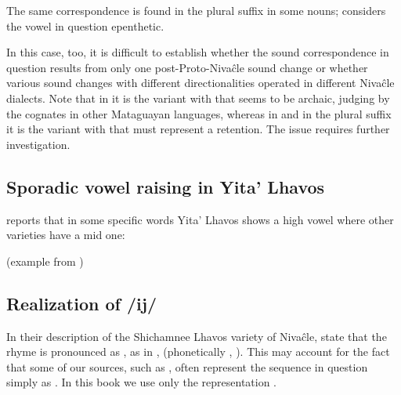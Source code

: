 The same correspondence is found in the plural suffix  in some nouns; \citet[276--277]{AnG15} considers the vowel in question epenthetic.

\ea
    \begin{xlist}
        \ex {} \recind {}
        \ex {} \recind {}
    \end{xlist}
\z
{}

In this case, too, it is difficult to establish whether the sound correspondence in question results from only one post-Proto-Nivaĉle sound change or whether various sound changes with different directionalities operated in different Nivaĉle dialects. Note that in  it is the variant with  that seems to be archaic, judging by the cognates in other Mataguayan languages, whereas in  and in the plural suffix  it is the variant with  that must represent a retention. The issue requires further investigation. 

\subsection{Sporadic vowel raising in Yita' Lhavos}\label{ni-yita-raising}

\citet[38]{AnG15} reports that in some specific words Yita' Lhavos shows a high vowel where other varieties have a mid one:

\ea
    \begin{xlist}
        \ex {} \recind {}
        \ex {} \recind {}
        \ex {} \recind {}
        \ex {} \recind {} (example from )
        \ex {} \recind {}
    \end{xlist}
\z
{}

\subsection{Realization of /ij/}\label{ni-iy-ii}
In their description of the Shichamnee Lhavos variety of Nivaĉle, \citet[73]{LC20} state that the rhyme  is pronounced as , as in ,  (phonetically , ). This may account for the fact that some of our sources, such as \citet{JS16}, often represent the sequence in question simply as . In this book we use only the representation .

